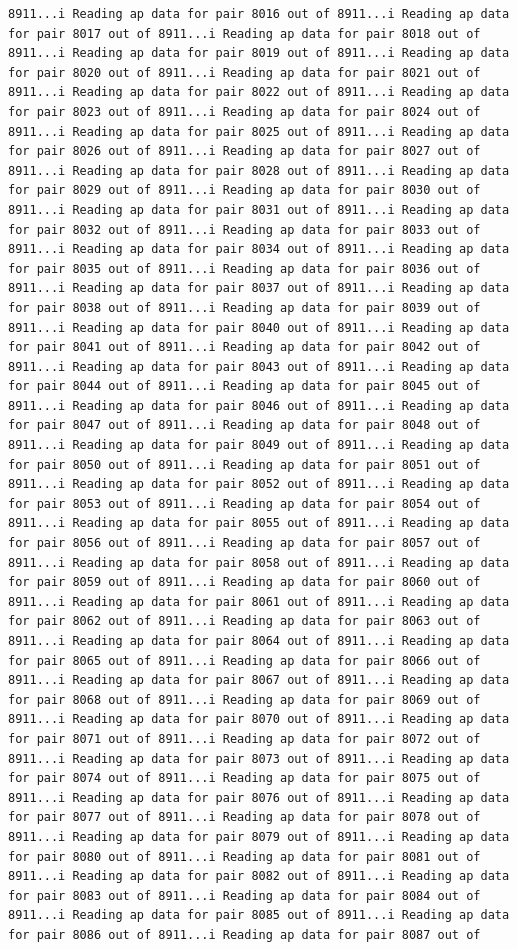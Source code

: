 \documentclass[
]{article}
\begin{document}
\begin{verbatim}
8911...i Reading ap data for pair 8016 out of 8911...i Reading ap data for pair 8017 out of 8911...i Reading ap data for pair 8018 out of 8911...i Reading ap data for pair 8019 out of 8911...i Reading ap data for pair 8020 out of 8911...i Reading ap data for pair 8021 out of 8911...i Reading ap data for pair 8022 out of 8911...i Reading ap data for pair 8023 out of 8911...i Reading ap data for pair 8024 out of 8911...i Reading ap data for pair 8025 out of 8911...i Reading ap data for pair 8026 out of 8911...i Reading ap data for pair 8027 out of 8911...i Reading ap data for pair 8028 out of 8911...i Reading ap data for pair 8029 out of 8911...i Reading ap data for pair 8030 out of 8911...i Reading ap data for pair 8031 out of 8911...i Reading ap data for pair 8032 out of 8911...i Reading ap data for pair 8033 out of 8911...i Reading ap data for pair 8034 out of 8911...i Reading ap data for pair 8035 out of 8911...i Reading ap data for pair 8036 out of 8911...i Reading ap data for pair 8037 out of 8911...i Reading ap data for pair 8038 out of 8911...i Reading ap data for pair 8039 out of 8911...i Reading ap data for pair 8040 out of 8911...i Reading ap data for pair 8041 out of 8911...i Reading ap data for pair 8042 out of 8911...i Reading ap data for pair 8043 out of 8911...i Reading ap data for pair 8044 out of 8911...i Reading ap data for pair 8045 out of 8911...i Reading ap data for pair 8046 out of 8911...i Reading ap data for pair 8047 out of 8911...i Reading ap data for pair 8048 out of 8911...i Reading ap data for pair 8049 out of 8911...i Reading ap data for pair 8050 out of 8911...i Reading ap data for pair 8051 out of 8911...i Reading ap data for pair 8052 out of 8911...i Reading ap data for pair 8053 out of 8911...i Reading ap data for pair 8054 out of 8911...i Reading ap data for pair 8055 out of 8911...i Reading ap data for pair 8056 out of 8911...i Reading ap data for pair 8057 out of 8911...i Reading ap data for pair 8058 out of 8911...i Reading ap data for pair 8059 out of 8911...i Reading ap data for pair 8060 out of 8911...i Reading ap data for pair 8061 out of 8911...i Reading ap data for pair 8062 out of 8911...i Reading ap data for pair 8063 out of 8911...i Reading ap data for pair 8064 out of 8911...i Reading ap data for pair 8065 out of 8911...i Reading ap data for pair 8066 out of 8911...i Reading ap data for pair 8067 out of 8911...i Reading ap data for pair 8068 out of 8911...i Reading ap data for pair 8069 out of 8911...i Reading ap data for pair 8070 out of 8911...i Reading ap data for pair 8071 out of 8911...i Reading ap data for pair 8072 out of 8911...i Reading ap data for pair 8073 out of 8911...i Reading ap data for pair 8074 out of 8911...i Reading ap data for pair 8075 out of 8911...i Reading ap data for pair 8076 out of 8911...i Reading ap data for pair 8077 out of 8911...i Reading ap data for pair 8078 out of 8911...i Reading ap data for pair 8079 out of 8911...i Reading ap data for pair 8080 out of 8911...i Reading ap data for pair 8081 out of 8911...i Reading ap data for pair 8082 out of 8911...i Reading ap data for pair 8083 out of 8911...i Reading ap data for pair 8084 out of 8911...i Reading ap data for pair 8085 out of 8911...i Reading ap data for pair 8086 out of 8911...i Reading ap data for pair 8087 out of 
\end{verbatim}
\end{document}
